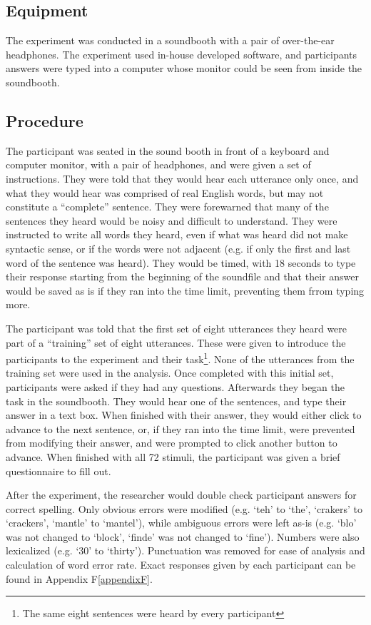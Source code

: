 \documentclass[dissertation,copyright]{uathesis}
\begin{document}
\subsection{Equipment}

The experiment was conducted in a soundbooth with a pair of over-the-ear headphones.  The experiment used in-house developed software, and participants answers were typed into a computer whose monitor could be seen from inside the soundbooth.

\subsection{Procedure}
\label{hsp-main-procedure}

The participant was seated in the sound booth in front of a keyboard and computer monitor, with a pair of headphones, and were given a set of instructions. They were told that they would hear each utterance only once, and what they would hear was comprised of real English words, but may not constitute a ``complete'' sentence.  They were forewarned that many of the sentences they heard would be noisy and difficult to understand. They were instructed to write all words they heard, even if what was heard did not make syntactic sense, or if the words were not adjacent (e.g. if only the first and last word of the sentence was heard). They would be timed, with 18 seconds to type their response starting from the beginning of the soundfile and that their answer would be saved as is if they ran into the time limit, preventing them frrom typing more.

The participant was told that the first set of eight utterances they heard were part of a ``training'' set of eight utterances.  These were given to introduce the participants to the experiment and their task\footnote{The same eight sentences were heard by every participant}.  None of the utterances from the training set were used in the analysis.  Once completed with this initial set, participants were asked if they had any questions.  Afterwards they began the task in the soundbooth.  They would hear one of the sentences, and type their answer in a text box.  When finished with their answer, they would either click to advance to the next sentence, or, if they ran into the time limit, were prevented from modifying their answer, and were prompted to click another button to advance.  When finished with all 72 stimuli, the participant was given a brief questionnaire to fill out.  

After the experiment, the researcher would double check participant answers for correct spelling.  Only obvious errors were modified (e.g. `teh' to `the', `crakers' to `crackers', `mantle' to `mantel'), while ambiguous errors were left as-is (e.g. `blo' was not changed to `block', `finde' was not changed to `fine').  Numbers were also lexicalized (e.g. `30' to `thirty').  Punctuation was removed for ease of analysis and calculation of word error rate.  Exact responses given by each participant can be found in Appendix F\ref{appendixF}.
\end{document}
